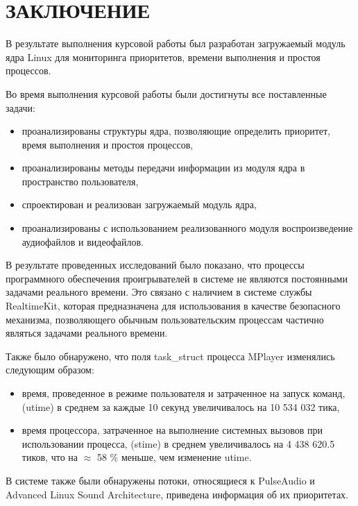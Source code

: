 \section*{ЗАКЛЮЧЕНИЕ}

В результате выполнения курсовой работы был разработан загружаемый модуль ядра Linux для мониторинга приоритетов, времени выполнения и простоя процессов.

Во время выполнения курсовой работы были достигнуты все поставленные задачи:
\begin{itemize}
\item проанализированы структуры ядра, позволяющие определить приоритет, время выполнения и простоя процессов,
\item проанализированы методы передачи информации из модуля ядра в пространство пользователя,
\item спроектирован и реализован загружаемый модуль ядра,
\item проанализированы с использованием реализованного модуля воспроизведение аудиофайлов и видеофайлов.
\end{itemize}

В результате проведенных исследований было показано, что процессы программного обеспечения проигрывателей в системе не являются постоянными задачами реального времени. Это связано с наличием в системе службы RealtimeKit, которая предназначена для использования в качестве безопасного механизма, позволяющего обычным пользовательским процессам частично являться задачами реального времени.

Также было обнаружено, что  поля task\_struct процесса MPlayer изменялись следующим образом:
\begin{itemize}
\item время, проведенное в режиме пользователя и затраченное на запуск команд, (utime) в среднем за каждые 10 секунд увеличивалось на 10 534 032 тика,
\item время процессора, затраченное на выполнение системных вызовов при использовании процесса, (stime) в среднем увеличивалось на 4 438 620.5 тиков, что на $\approx$ 58 \% меньше, чем изменение utime.
\end{itemize}

В системе также были обнаружены потоки, относящиеся к PulseAudio и Advanced Linux Sound Architecture, приведена информация об их приоритетах.

\pagebreak